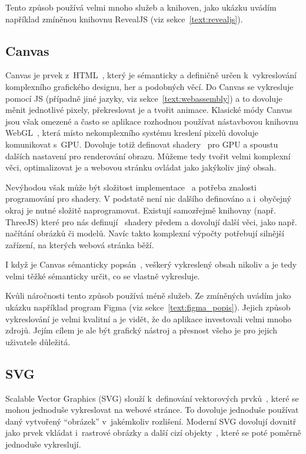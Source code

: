 Tento způsob používá velmi mnoho služeb a knihoven, jako ukázku uvádím například zmíněnou knihovnu RevealJS (viz sekce~\ref{text:revealjs}).

\subsection{Canvas}

Canvas je prvek z~HTML~\cite{canvashtml5, uzayr2022frontend}, který je sémanticky a definičně určen k~vykreslování komplexního grafického designu, her a podobných věcí.
Do Canvas se vykresluje pomocí JS (případně jiné jazyky, viz sekce~\ref{text:webassembly}) a to dovoluje měnit jednotlivé pixely, překreslovat je a tvořit animace.
Klasické módy Canvas jsou však omezené a často se aplikace rozhodnou používat nástavbovou knihovnu WebGL~\cite{canvashtml5}, která místo nekomplexního systému kreslení pixelů dovoluje komunikovat s~GPU.
Dovoluje totiž definovat shadery~\cite{canvashtml5} pro GPU a spoustu dalších nastavení pro renderování obrazu.
Můžeme tedy tvořit velmi komplexní věci, optimalizovat je a webovou stránku ovládat jako jakýkoliv jiný obsah. 

Nevýhodou však může být složitost implementace~\cite{canvashtml5} a potřeba znalosti programování pro shadery.
V podstatě není nic dalšího definováno a i~obyčejný okraj je nutné složitě naprogramovat.
Existují samozřejmě knihovny (např. ThreeJS) které pro nás definují~\cite{canvashtml5} shadery předem a dovolují další věci, jako např. načítání obrázků či modelů.
Navíc takto komplexní výpočty potřebují silnější zařízení, na kterých webová stránka běží.

I když je Canvas sémanticky popsán~\cite{canvashtml5}, veškerý vykreslený obsah nikoliv a je tedy velmi těžké sémanticky určit, co se vlastně vykresluje.

Kvůli náročnosti tento způsob používá méně služeb. 
Ze zmíněných uvádím jako ukázku například program Figma (viz sekce~\ref{text:figma_popis}).
Jejich způsob vykreslování je velmi kvalitní a je vidět, že do aplikace investovali velmi mnoho zdrojů.
Jejím cílem je ale být grafický nástroj a přesnost všeho je pro jejich uživatele důležitá.

\subsection{SVG}

Scalable Vector Graphics (SVG) slouží k~definování vektorových prvků~\cite{svg_css_html}, které se mohou jednoduše vykreslovat na webové stránce.
To dovoluje jednoduše používat daný vytvořený \enquote{obrázek} v~jakémkoliv rozlišení.
Moderní SVG dovolují dovnitř jako prvek vkládat i~rastrové obrázky a další cizí objekty~\cite{svg_css_html, uzayr2022frontend}, které se poté poměrně jednoduše vykreslují.

